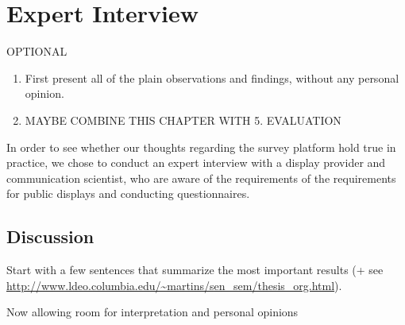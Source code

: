 \section{Expert Interview}

OPTIONAL

\begin{enumerate}
\item First present all of the plain observations and findings, without any personal opinion.
\item MAYBE COMBINE THIS CHAPTER WITH 5. EVALUATION
\end{enumerate}

In order to see whether our thoughts regarding the survey platform hold true in practice, we chose to conduct an expert interview with a display provider and communication scientist, who are aware of the requirements of the requirements for public displays and conducting questionnaires.



\subsection{Discussion}

Start with a few sentences that summarize the most important results (+ see \url{http://www.ldeo.columbia.edu/~martins/sen_sem/thesis_org.html}).

Now allowing room for interpretation and personal opinions

